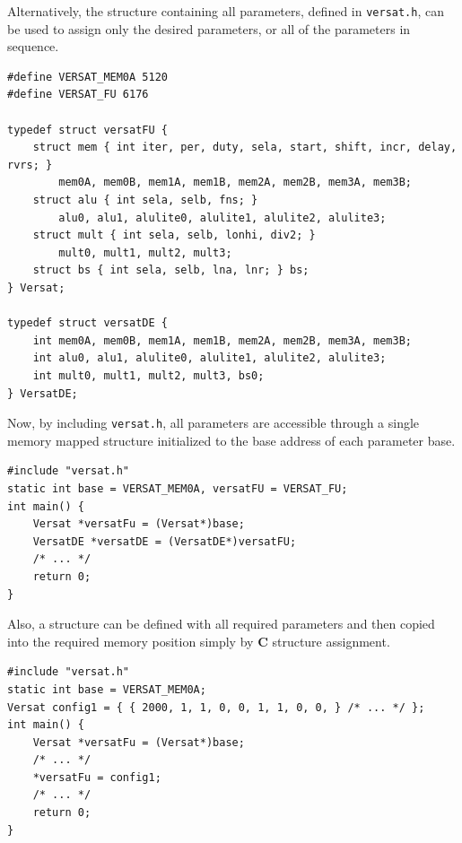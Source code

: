 Alternatively, the structure containing all parameters, defined in
{\tt versat.h}, can be used to assign only the desired parameters,
or all of the parameters in sequence.
\begin{verbatim}
#define VERSAT_MEM0A 5120
#define VERSAT_FU 6176

typedef struct versatFU {
    struct mem { int iter, per, duty, sela, start, shift, incr, delay, rvrs; }
        mem0A, mem0B, mem1A, mem1B, mem2A, mem2B, mem3A, mem3B;
    struct alu { int sela, selb, fns; }
        alu0, alu1, alulite0, alulite1, alulite2, alulite3;
    struct mult { int sela, selb, lonhi, div2; }
        mult0, mult1, mult2, mult3;
    struct bs { int sela, selb, lna, lnr; } bs;
} Versat;

typedef struct versatDE {
    int mem0A, mem0B, mem1A, mem1B, mem2A, mem2B, mem3A, mem3B;
    int alu0, alu1, alulite0, alulite1, alulite2, alulite3;
    int mult0, mult1, mult2, mult3, bs0;
} VersatDE;
\end{verbatim}

Now, by including {\tt versat.h}, all parameters are accessible through
a single memory mapped structure initialized to the base address of each
parameter base.

\begin{verbatim}
#include "versat.h"
static int base = VERSAT_MEM0A, versatFU = VERSAT_FU;
int main() {
    Versat *versatFu = (Versat*)base;
    VersatDE *versatDE = (VersatDE*)versatFU;
    /* ... */
    return 0;
}
\end{verbatim}

Also, a structure can be defined with all required parameters and then copied
into the required memory position simply by {\bf C} structure assignment.

\begin{verbatim}
#include "versat.h"
static int base = VERSAT_MEM0A;
Versat config1 = { { 2000, 1, 1, 0, 0, 1, 1, 0, 0, } /* ... */ };
int main() {
    Versat *versatFu = (Versat*)base;
    /* ... */
    *versatFu = config1;
    /* ... */
    return 0;
}
\end{verbatim}


